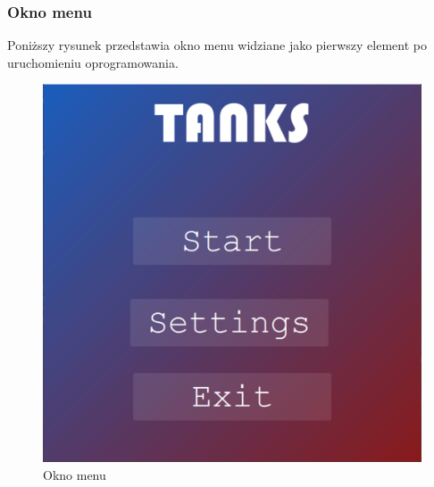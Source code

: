\documentclass[11pt,a4paper]{report}
\begin{document}
\subsubsection{Okno menu}
Poniższy rysunek przedstawia okno menu widziane jako pierwszy element po uruchomieniu oprogramowania.
\begin{figure}[!ht]
\centerline{\includegraphics{img/menu.png}}
\caption{Okno menu }
\end{figure}
\newpage
\end{document}
